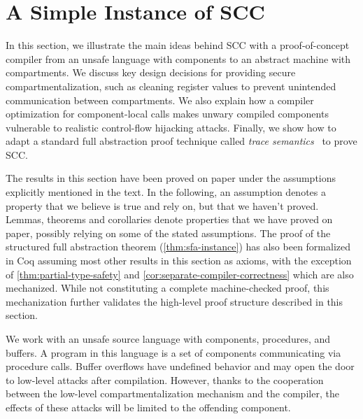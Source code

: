 \documentclass[10pt, conference, compsocconf, letterpaper, times]{IEEEtran}
\begin{document}
\section{A Simple Instance of SCC}
\label{sec:instance}

\iffull
{}
\fi

In this section, we illustrate the main ideas behind SCC with a
proof-of-concept compiler from an unsafe language with components to
an abstract machine with compartments.
We discuss key design decisions for providing secure
compartmentalization, such as cleaning register values to prevent
unintended communication between compartments.
We also explain how a compiler optimization for component-local calls
makes unwary compiled components vulnerable to realistic control-flow
hijacking attacks.
Finally, we show how to adapt a standard full abstraction proof
technique called {\em trace semantics}~\cite{PatrignaniASJCP15} to
prove SCC.

The results in this section have been proved on paper under
the assumptions explicitly mentioned in the text. 
In the following, an assumption denotes a property that we believe
is true and rely on, but that we haven't proved.
Lemmas, theorems and corollaries denote properties that we have
proved on paper, possibly relying on some of the stated assumptions.
The proof of the structured full abstraction theorem
(\autoref{thm:sfa-instance}) has also been formalized in Coq assuming
most other results in this section as axioms, with the exception of
\autoref{thm:partial-type-safety} and
\autoref{cor:separate-compiler-correctness} which are also mechanized.
While not constituting a complete machine-checked proof, this
mechanization further validates the high-level proof structure
described in this section.

\label{sec:source}

We work with an unsafe source language with components,
procedures, and buffers.  A program in this language is a set
of components communicating via procedure calls.
Buffer overflows have undefined behavior and may open the door to
low-level attacks after compilation.
However, thanks to the cooperation between the low-level
compartmentalization mechanism and the compiler,
the effects of these attacks will be limited to the offending
component.
\end{document}
